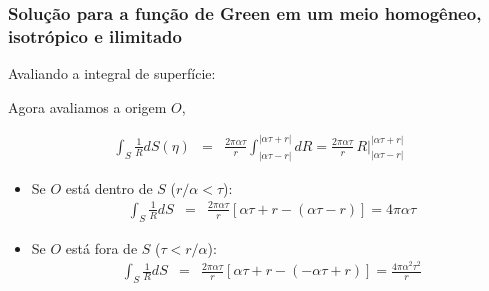 \documentclass{beamer}
\begin{document}
\begin{frame}
	\frametitle{\textbf{Solu\c{c}\~ao para a fun\c{c}\~ao de Green em um meio homog\^eneo, isotr\'opico e ilimitado}}
	\begin{flushleft}
		\textcolor{red!60!black}{Avaliando a integral de superf\'icie:}
	\end{flushleft}
	
	\begin{flushleft}
		Agora avaliamos a origem $O$, 
	\end{flushleft}
	\begin{eqnarray}
	\label{ten1}
	\int_{S} \frac{1}{R} dS(\eta)  &=& \frac{2\pi \alpha \tau}{r} \int_{\left| \alpha\tau -r \right|}^{\left| \alpha\tau +r \right|}  dR  = \frac{2\pi \alpha \tau}{r}\, R \Big|_{\left| \alpha\tau -r \right|}^{\left| \alpha\tau +r \right|} \, 
	\end{eqnarray}
	
	\begin{itemize}
		\item Se $O$ est\'a dentro de $S$ ($ r/\alpha < \tau $):
		\begin{eqnarray}
		\label{ten1}
		\int_{S} \frac{1}{R} dS &=& \frac{2\pi \alpha \tau}{r}\left[\alpha \tau +r - (\alpha \tau -r )  \right] = 4\pi \alpha \tau
		\end{eqnarray}
		\item Se $O$ est\'a fora de $S$ ($  \tau < r/\alpha $):
		\begin{eqnarray}
		\label{ten1}
		\int_{S} \frac{1}{R} dS &=& \frac{2\pi \alpha \tau}{r}\left[\alpha \tau +r - (-\alpha \tau + r )  \right] = \frac{4\pi \alpha^2 \tau^2}{r} 
		\end{eqnarray}
	\end{itemize}
	
\end{frame}%
\end{document}
